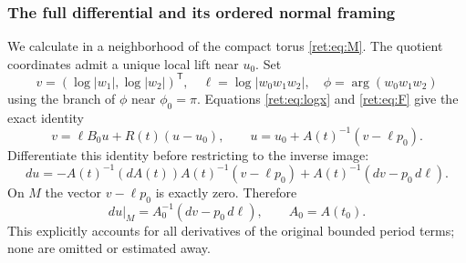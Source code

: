 \documentclass[11pt]{article}
\theoremstyle{definition}
\begin{document}
\subsubsection{The full differential and its ordered normal framing}

We calculate in a neighborhood of the compact torus \eqref{ret:eq:M}.
The quotient coordinates admit a unique local lift near \(u_0\).
Set
\[
 v=(\log|w_1|,\log|w_2|)^{\mathsf T},\quad
 \ell=\log|w_0w_1w_2|,\quad
 \phi=\arg(w_0w_1w_2)
\]
using the branch of \(\phi\) near \(\phi_0=\pi\).
Equations \eqref{ret:eq:logx} and \eqref{ret:eq:F} give the exact identity
\begin{equation}
 v=\ell B_0u+R(t)(u-u_0),\qquad
 u=u_0+A(t)^{-1}(v-\ell p_0).
 \label{ret:eq:exact-u}
\end{equation}
Differentiate this identity before restricting to the inverse image:
\begin{equation}
 du=-A(t)^{-1}(dA(t))A(t)^{-1}(v-\ell p_0)
        +A(t)^{-1}(dv-p_0\,d\ell).
 \label{ret:eq:full-derivative}
\end{equation}
On \(M\) the vector \(v-\ell p_0\) is exactly zero.  Therefore
\begin{equation}
 du|_M=A_0^{-1}(dv-p_0\,d\ell),\qquad A_0=A(t_0).
 \label{ret:eq:derivative-on-M}
\end{equation}
This explicitly accounts for all derivatives of the original bounded
period terms; none are omitted or estimated away.
\end{document}
